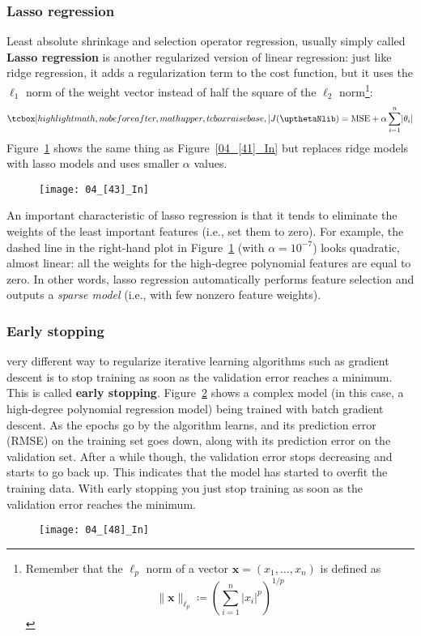 \subsubsection{Lasso regression}
Least absolute shrinkage and selection operator regression, usually simply called \textbf{Lasso regression} is another regularized version of linear regression: just like ridge regression, it adds a regularization term to the cost function, but it uses the $\ell_1$ norm of the weight vector instead of half the square of the $\ell_2$ norm\footnote{Remember that the $\ell_p$ norm of a vector $\mathbf{x}=(x_1,\ldots,x_n)$ is defined as
\begin{equation}
\|\mathbf{x}\|_{\ell_p}\coloneqq{\left(\sum_{i=1}^n{\lvert x_i\rvert}^p\right)}^{1/p}
\end{equation}}:
\begin{equation}
\tcbhighmath{J(\boldtheta)=\text{MSE}+\alpha\sum_{i=1}^n\lvert\theta_i\rvert}
\end{equation}
Figure~\ref{04_[43]_In} shows the same thing as Figure~\ref{04_[41]_In} but replaces ridge models with lasso models and uses smaller $\alpha$ values.
\begin{figure}[h!t]
\centering
\texttt{[image: 04\_[43]\_In]}
\caption{}\label{04_[43]_In}
\end{figure}

An important characteristic of lasso regression is that it tends to eliminate the weights of the least important features (i.e., set them to zero). For example, the dashed line in the right-hand plot in Figure~\ref{04_[43]_In} (with $\alpha=10^{-7}$) looks quadratic, almost linear: all the weights for the high-degree polynomial features are equal to zero. In other words, lasso regression automatically performs feature selection and outputs a \emph{sparse model} (i.e., with few nonzero feature weights).
\subsubsection{Early stopping}
very different way to regularize iterative learning algorithms such as gradient descent is to stop training as soon as the validation error reaches a minimum. This is called \textbf{early stopping}. Figure~\ref{04_[48]_In} shows a complex model (in this case, a high-degree polynomial regression model) being trained with batch gradient descent. As the epochs go by the algorithm learns, and its prediction error (RMSE) on the training set goes down, along with its prediction error on the validation set. After a while though, the validation error stops decreasing and starts to go back up. This indicates that the model has started to overfit the training data. With early stopping you just stop training as soon as the validation error reaches the minimum.
\begin{figure}[h!t]
\centering
\texttt{[image: 04\_[48]\_In]}
\caption{}\label{04_[48]_In}
\end{figure}
